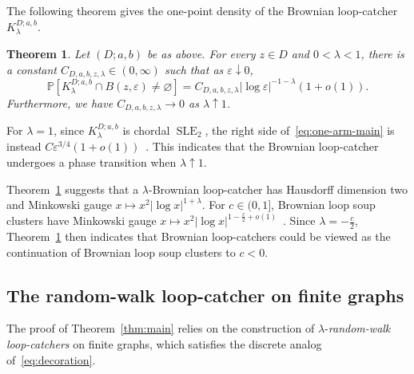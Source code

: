 \documentclass[11pt]{article}
\numberwithin{equation}{section}
\newcommand{\1}{\mathbf{1}}
\DeclareMathOperator{\SLE}{SLE}
\newtheorem{theorem}{Theorem}[section]
\newcommand{\Prob}{\mathbb P}
\begin{document}
The following theorem gives the one-point density of the Brownian loop-catcher $K_\lambda^{D;a,b}$.
\begin{theorem}\label{thm:one-arm}
Let $(D;a,b)$ be as above. For every $z\in D$ and $0<\lambda<1$, there is a constant
\(C_{D,a,b,z,\lambda}\in(0,\infty)\) such that as $\varepsilon\downarrow0$,
\begin{equation}\label{eq:one-arm-main}
 \Prob\!\left[K_\lambda^{D;a,b}\cap B(z,\varepsilon)\ne\varnothing\right]
= C_{D,a,b,z,\lambda}|\log\varepsilon|^{-1-\lambda}(1+o(1)).
\end{equation}
Furthermore, we have \(C_{D,a,b,z,\lambda}\to 0\) as \(\lambda \uparrow 1\).
\end{theorem}
For $\lambda=1$, since $K_\lambda^{D;a,b}$ is chordal $\SLE_2$, the right side of~\eqref{eq:one-arm-main} is instead  $C\varepsilon^{3/4}(1+o(1))$~\cite{beffara-dim,lawler-rezai-nat}. This indicates that the Brownian loop-catcher undergoes a phase transition when $\lambda\uparrow 1$.

Theorem~\ref{thm:one-arm} suggests that a $\lambda$-Brownian loop-catcher has Hausdorff dimension two and Minkowski gauge $x\mapsto x^2|\log x|^{1+\lambda}$. For $c\in(0,1]$, Brownian loop soup clusters have Minkowski gauge $x\mapsto x^2|\log x|^{1-\frac{c}{2}+o(1)}$~\cite{jego2023conformally}. Since $\lambda=-\frac{c}{2}$, Theorem~\ref{thm:one-arm} then indicates that Brownian loop-catchers could be viewed as the continuation of Brownian loop soup clusters to $c<0$.


\subsection{The random-walk loop-catcher on finite graphs}\label{subsec:finite-main}

The proof of Theorem~\ref{thm:main} relies on the construction of
\(\lambda\)-\emph{random-walk loop-catchers} on finite graphs, which satisfies the discrete analog of~\eqref{eq:decoration}.
\end{document}
